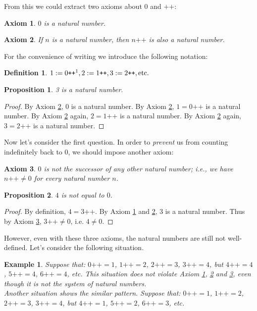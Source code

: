 \documentclass[a4paper,oneside]{book}
\newtheorem*{proof}{\textit{Proof.}}
\newtheorem{definition}{Definition}[section]
\newtheorem{axiom}{Axiom}[chapter]
\newtheorem{example}{Example}[section]
\newtheorem{proposition}{Proposition}[section]
\begin{document}
			From this we could extract two axioms about $0$ and $\texttt{++}$:
			\begin{axiom}
				\label{ax:peano1}
				$0$ is a natural number.
			\end{axiom}
			\begin{axiom}
				\label{ax:peano2}
				If $n$ is a natural number, then $n\texttt{++}$ is also a natural number.
			\end{axiom}
			For the convenience of writing we introduce the following notation:
			\begin{definition}
				$1 :=0\texttt{++}\footnotemark, 2 :=1\texttt{++}, 3 :=2\texttt{++}, \mathrm{etc.}$ 
			\end{definition}
			\begin{proposition}
				3 is a natural number.
			\end{proposition}
			\begin{proof}
				By Axiom \ref{ax:peano2}, $0$ is a natural number. By Axiom \ref{ax:peano2}, $1 = 0\texttt{++}$ is a natural number. By Axiom \ref{ax:peano2} again, $2 = 1\texttt{++}$ is a natural number. By Axiom \ref{ax:peano2} again, $3 = 2\texttt{++}$ is a natural number.
			\end{proof}
			Now let's consider the first question. In order to \textit{prevent} us from counting indefinitely back to $0$, we should impose another axiom:
			\begin{axiom}
				\label{ax:peano3}
				$0$ is not the successor of any other natural number; i.e., we have $n\texttt{++} \neq 0$ for every natural number $n$.
			\end{axiom}
			\begin{proposition}
				\label{pro:4<>0}
				$4$ is not equal to $0$.
			\end{proposition}
			\begin{proof}
				By definition, $4=3\texttt{++}$. By Axiom \ref{ax:peano1} and \ref{ax:peano2}, 3 is a natural number. Thus by Axiom \ref{ax:peano3}, $3\texttt{++} \neq 0$, i.e. $4 \neq 0$.
			\end{proof}
			However, even with these three axioms, the natural numbers are still not well-defined. Let's consider the following situation.
			\begin{example}
				Suppose that: $0\texttt{++}=1$, $1\texttt{++}=2$, $2\texttt{++}=3$, $3\texttt{++}=4$, but $4\texttt{++}=4$, $5\texttt{++}=4$, $6\texttt{++}=4$, etc. This situation does not violate Axiom \ref{ax:peano1}, \ref{ax:peano2} and \ref{ax:peano3}, even though it is not the system of natural numbers.\\
				Another situation shows the similar pattern. Suppose that: $0\texttt{++}=1$, $1\texttt{++}=2$, $2\texttt{++}=3$, $3\texttt{++}=4$, but $4\texttt{++}=1$, $5\texttt{++}=2$, $6\texttt{++}=3$, etc.
			\end{example}
\end{document}
